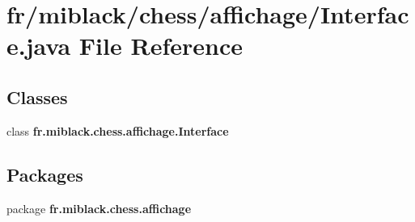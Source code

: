 \section{fr/miblack/chess/affichage/\-Interface.java File Reference}
\label{Interface_8java}
\subsection*{Classes}
\begin{DoxyCompactItemize}
\item 
class {\bf fr.\-miblack.\-chess.\-affichage.\-Interface}
\end{DoxyCompactItemize}
\subsection*{Packages}
\begin{DoxyCompactItemize}
\item 
package {\bf fr.\-miblack.\-chess.\-affichage}
\end{DoxyCompactItemize}
